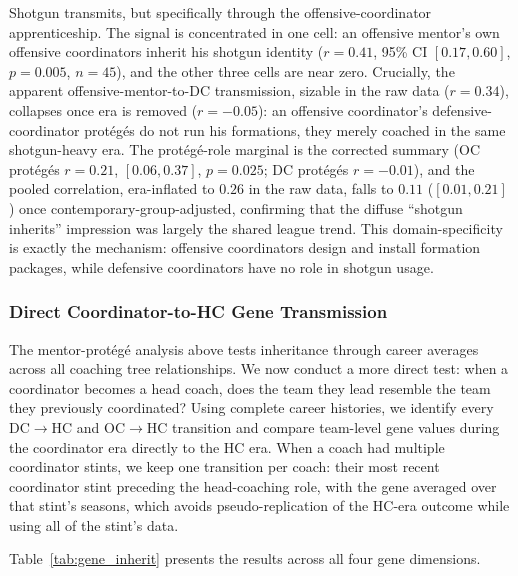 \documentclass[USenglish]{article}
\theoremstyle{dgthm}
\theoremstyle{dgdef}
\begin{document}
Shotgun transmits, but specifically through the offensive-coordinator apprenticeship. The signal is concentrated in one cell: an offensive mentor's own offensive coordinators inherit his shotgun identity ($r=0.41$, 95\% CI $[0.17, 0.60]$, $p=0.005$, $n=45$), and the other three cells are near zero. Crucially, the apparent offensive-mentor-to-DC transmission, sizable in the raw data ($r=0.34$), collapses once era is removed ($r=-0.05$): an offensive coordinator's defensive-coordinator prot\'{e}g\'{e}s do not run his formations, they merely coached in the same shotgun-heavy era. The prot\'{e}g\'{e}-role marginal is the corrected summary (OC prot\'{e}g\'{e}s $r=0.21$, $[0.06, 0.37]$, $p=0.025$; DC prot\'{e}g\'{e}s $r=-0.01$), and the pooled correlation, era-inflated to $0.26$ in the raw data, falls to $0.11$ ($[0.01, 0.21]$) once contemporary-group-adjusted, confirming that the diffuse ``shotgun inherits'' impression was largely the shared league trend. This domain-specificity is exactly the mechanism: offensive coordinators design and install formation packages, while defensive coordinators have no role in shotgun usage.

\subsubsection{Direct Coordinator-to-HC Gene Transmission}

The mentor-prot\'{e}g\'{e} analysis above tests inheritance through career averages across all coaching tree relationships. We now conduct a more direct test: when a coordinator becomes a head coach, does the team they lead resemble the team they previously coordinated? Using complete career histories, we identify every DC$\rightarrow$HC and OC$\rightarrow$HC transition and compare team-level gene values during the coordinator era directly to the HC era. When a coach had multiple coordinator stints, we keep one transition per coach: their most recent coordinator stint preceding the head-coaching role, with the gene averaged over that stint's seasons, which avoids pseudo-replication of the HC-era outcome while using all of the stint's data.

Table~\ref{tab:gene_inherit} presents the results across all four gene dimensions.
\end{document}
